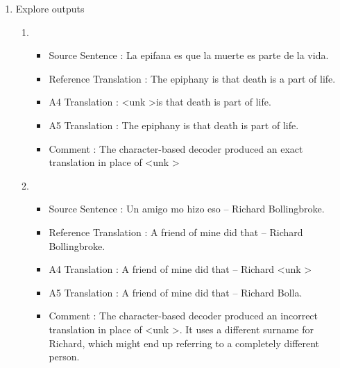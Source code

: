 \documentclass[]{article}
\begin{document}
\begin{enumerate}
\begin{enumerate}
	\item 
	
			Explore outputs
		
				\begin{enumerate}
					\item 
					\begin{itemize}
						\item Source Sentence : La epifana es que la muerte es parte de la vida.
						\item Reference Translation  : The epiphany is  that death is a part of life.
						\item A4 Translation : \textless unk \textgreater is that death is part of life.
						\item A5 Translation : The epiphany is that death is part of life.						
						\item Comment : The character-based decoder produced an exact translation in place of \textless unk \textgreater
					
					\end{itemize}

					\item 
					\begin{itemize}
						\item Source Sentence : Un amigo mo hizo eso -- Richard Bollingbroke.
						\item Reference Translation  : A friend of mine did that -- Richard Bollingbroke.
						\item A4 Translation : A friend of mine did that -- Richard \textless unk \textgreater
						\item A5 Translation : A friend of mine did that -- Richard Bolla.						
						\item Comment : The character-based decoder produced an incorrect translation in place of \textless unk \textgreater. It uses a different surname for Richard, which might end up referring to a completely different person.
						
					\end{itemize}
			\end{enumerate}
	
	\end{enumerate}

\end{enumerate}
\end{document}
